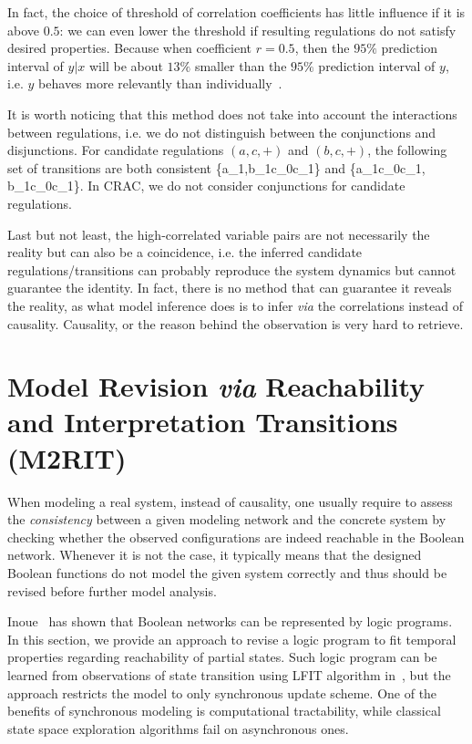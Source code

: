 In fact, the choice of threshold of correlation coefficients has little influence if it is above $0.5$: we can even lower the threshold if resulting regulations do not satisfy desired properties.
Because when coefficient $r =0.5$, then the $95\%$ prediction interval of $y|x$ will be about $13\%$ smaller than the $95\%$ prediction interval of $y$, i.e. $y$ behaves more relevantly than individually~\cite{hull1927correlation}.

It is worth noticing that this method does not take into account the interactions between regulations, i.e. we do not distinguish between the conjunctions and disjunctions.
For candidate regulations $(a,c,+)$ and $(b,c,+)$, the following set of transitions are both consistent \{\ac{a_1,b_1}{c_0}{c_1}\} and \{\ac{a_1}{c_0}{c_1}, \ac{b_1}{c_0}{c_1}\}.
In CRAC, we do not consider conjunctions for candidate regulations.

Last but not least, the high-correlated variable pairs are not necessarily the reality but can also be a coincidence, i.e. the inferred candidate regulations/transitions can probably reproduce the system dynamics but cannot guarantee the identity.
In fact, there is no method that can guarantee it reveals the reality, as what model inference does is to infer \textit{via} the correlations instead of causality.
Causality, or the reason behind the observation is very hard to retrieve.

\section{Model Revision \textit{via} Reachability and Interpretation Transitions (M2RIT)}
When modeling a real system, instead of causality, one usually require to assess the \textit{consistency} between a given modeling network and the concrete system by checking whether the observed configurations are indeed reachable in the Boolean network.
Whenever it is not the case, it typically means that the designed Boolean functions do not model the given system correctly and thus should be revised before further model analysis.

Inoue~\cite{inoue2011logic} has shown that Boolean networks can be represented by logic programs.
In this section, we provide an approach to revise a logic program to fit temporal properties regarding reachability of partial states.
%
Such logic program can be learned from observations of state transition using LFIT algorithm in~\cite{ribeiro2015learning}, but the approach restricts the model to only synchronous update scheme.
One of the benefits of synchronous modeling is computational tractability, while classical state space exploration algorithms fail on asynchronous ones.

